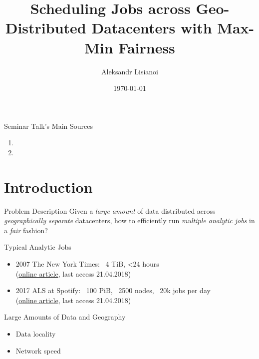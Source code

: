 \documentclass[presentation,professionalfonts]{beamer}
\institute[TU Wien]{Seminar ``\semname''\\\semester}
\date{\today}
\title[Scheduling Jobs with Max-Min Fairness]{Scheduling Jobs across Geo-Distributed Datacenters with Max-Min Fairness}
\author[Aleksandr Lisianoi]{Aleksandr Lisianoi}
\begin{document}
\maketitle

\begin{frame}{Seminar Talk's Main Sources}
  \begin{enumerate}
  \item {}
  \item {}
  \end{enumerate}
\end{frame}



\section{Introduction}

\begin{frame}{Problem Description}
    Given a \emph{large amount} of data distributed across
    \emph{geographically separate} datacenters, how to efficiently run
    \emph{multiple analytic jobs} in a \emph{fair} fashion?
\end{frame}

\begin{frame}{Typical Analytic Jobs}
  \begin{itemize}
  \item 2007 The New York Times: ~4 TiB, <24 hours \\
    (\href{https://open.blogs.nytimes.com/2007/11/01/self-service-prorated-super-computing-fun/}{online article}, last access 21.04.2018)
  \item 2017 ALS at Spotify: ~100 PiB, ~2500 nodes, ~20k jobs per day \\
    (\href{https://labs.spotify.com/2017/10/16/big-data-processing-at-spotify-the-road-to-scio-part-1/}{online article}, last access 21.04.2018)
  \end{itemize}
\end{frame}

\begin{frame}{Large Amounts of Data and Geography}
  \begin{itemize}
  \item Data locality
  \item Network speed
  \end{itemize}
\end{frame}
\end{document}
